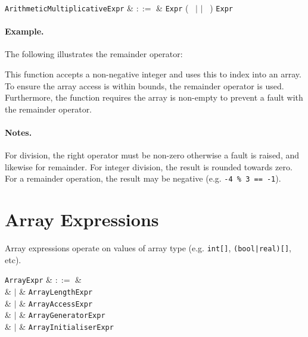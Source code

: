 \begin{syntax}
  \verb+ArithmeticMultiplicativeExpr+ & $::=$ & \verb+Expr+ \big(\ \token{*} $|$ \token{/} $|$ \token{\%}\ \big) \verb+Expr+\\
\end{syntax}

\paragraph{Example.} The following illustrates the remainder operator:



This function accepts a non-negative integer and uses this to index into an array.  To ensure the array access is within bounds, the remainder operator is used.  Furthermore, the function requires the array is non-empty to prevent a fault with the remainder operator.

\paragraph{Notes.}  For division, the right operator must be non-zero otherwise a \gls{fault} is raised, and likewise for remainder.  For integer division, the result is rounded towards zero.  For a remainder operation, the result may be negative (e.g. \lstinline{-4 % 3 == -1}).


\section{Array Expressions}
\label{c_expr_array}

Array expressions operate on values of array type (e.g. \lstinline{int[]}, \lstinline{(bool|real)[]}, etc).

\begin{syntax}
  \verb+ArrayExpr+ & $::=$ &\\
  & $|$ & \verb+ArrayLengthExpr+\\
  & $|$ & \verb+ArrayAccessExpr+\\
  & $|$ & \verb+ArrayGeneratorExpr+\\
  & $|$ & \verb+ArrayInitialiserExpr+\\
\end{syntax}

